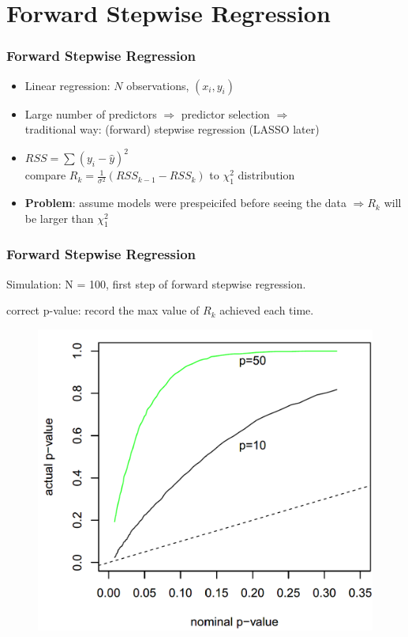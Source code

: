 \documentclass{beamer}
\begin{document}
\section{Forward Stepwise Regression}
\begin{frame}
\frametitle{Forward Stepwise Regression}
\begin{itemize}
	\item
	Linear regression: $N$ observations, $(x_i, y_i)$
	\item
	Large number of predictors $\Rightarrow$  predictor selection $\Rightarrow$ \\
	traditional way: (forward) stepwise regression (LASSO later)
	\item
	$RSS = \sum{(y_i - \hat{y})^2}$\\
	compare $R_k = \frac{1}{\sigma^2}(RSS_{k-1} - RSS_k)$ to $\chi^2_1$ distribution
	\item
	\textbf{Problem}:  assume models were prespeicifed before seeing the data	$\Rightarrow R_k$ will be larger than $\chi^2_1$
\end{itemize}
\end{frame}

\begin{frame}
\frametitle{Forward Stepwise Regression}
Simulation: N = 100, first step of forward stepwise regression.

correct p-value: record the max value of $R_k$ achieved each time.
\begin{figure}
\includegraphics[width=0.6\linewidth]{stepwise_pvalue.png}
\end{figure}
\end{frame}
\end{document}
